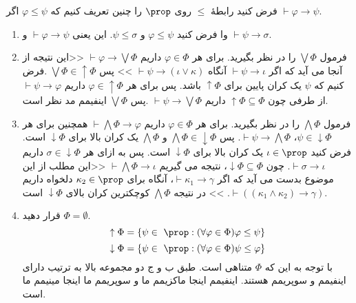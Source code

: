 فرض کنید رابطهٔ
$\leq$
روی
$\prop$
را چنین تعریف کنیم که
$\varphi\leq\psi$
اگر
$\vdash\varphi\to\psi$.
\begin{enumerate}[label=(\alph*)]
   \item 
        وا
        فرض کنید
        $\varphi\leq\psi$
        و
        $\psi\leq\sigma$.
        این یعنی
        $\vdash\varphi\to\psi$
        و
        $\vdash\psi\to\sigma$.

        \item فرمول 
        $\bigvee\Phi$
        را در نظر بگیرید. 
        برای هر 
        $\varphi\in\Phi$
        داریم 
        $\vdash\varphi\to\bigvee\Phi$
        <<این نتیجه از آنجا می آید که اگر 
        $\vdash\psi\to\iota$
        آنگاه 
        $\vdash\psi\to(\iota\vee\kappa)$
        >>
        پس 
        $\bigvee\Phi\in\uparrow\Phi$
        .فرض کنیم که 
        $\psi$
        یک کران پایین برای 
        $\uparrow\Phi$
        باشد. پس برای هر 
        $\varphi\in\uparrow\Phi$
        داریم
        $\vdash\psi\to\varphi$
        از طرفی چون
        $\uparrow\Phi\subseteq\Phi$
        داریم 
        $\vdash\psi\to\bigvee\Phi$
        .پس 
        $\bigvee\Phi$
        اینفیمم مد نظر است.

        \item فرمول
        $\bigwedge\Phi$
        را در نظر بگیرید. برای هر 
        $\varphi\in\Phi$
        داریم
        $\vdash\bigwedge\Phi\to\varphi$
        همچنین برای هر 
        $\psi\in\downarrow\Phi$،
        $\vdash\psi\to\bigwedge\Phi$.
        پس 
        $\bigwedge\Phi\in\downarrow\Phi$
        و
        $\bigwedge\Phi$
        یک کران بالا برای 
        $\downarrow\Phi$
        است. فرض کنید 
        $\iota\in\prop$
        یک کران بالا برای 
        $\downarrow\Phi$
        است. پس به ازای هر 
        $\sigma\in\downarrow\Phi$
        داریم 
        $\vdash\sigma\to\iota$.
        چون 
        $\downarrow\Phi\subseteq\Phi$،
        نتیجه می گیریم
        $\vdash\bigwedge\Phi\to\iota$
        <<این مطلب از این موضوع بدست می آید که 
        اگر 
        $\vdash\kappa_{1}\to\gamma$،
        آنگاه برای
        $\kappa_{2}\in\prop$
        دلخواه داریم
        $\vdash((\kappa_{1}\wedge\kappa_{2})\to\gamma)$.
        >>
        در نتیجه 
        $\bigwedge\Phi$
        کوچکترین کران بالای 
        $\downarrow\Phi$
        است.

        \item قرار دهید
        $\Phi=\emptyset$.
        \[\uparrow\Phi = \{\psi\in \ \prop :(\forall\varphi\in\Phi)\varphi\leq\psi\}\]
        \[\downarrow\Phi = \{\psi\in \ \prop :(\forall\varphi\in\Phi)\psi\leq\varphi\}\]
        با توجه به این که 
        $\Phi$
        متناهی است. طبق ب و ج دو مجموعه بالا به ترتیب دارای اینفیمم و سوپریمم هستند. 
        اینفیمم اینجا ماکزیمم ما و سوپریمم ما اینجا مینیمم ما است. 


\end{enumerate}
